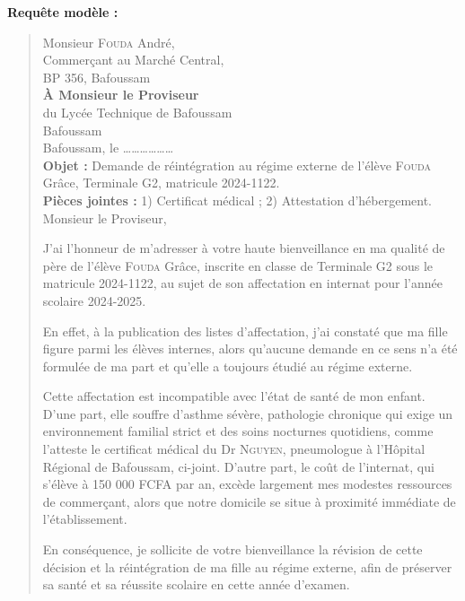 \documentclass[11pt]{article}
\begin{document}
\begin{corrige}
\textbf{Requête modèle :}
\begin{quote}
Monsieur \textsc{Fouda} André,\\
Commerçant au Marché Central,\\
BP 356, Bafoussam\\[0.5em]
\hspace*{6cm}\textbf{À Monsieur le Proviseur}\\
\hspace*{6cm}du Lycée Technique de Bafoussam\\
\hspace*{6cm}Bafoussam\\[0.5em]
\hspace*{6cm}Bafoussam, le \ldots\ldots\ldots\ldots\ldots\ldots\\[0.5em]
\textbf{Objet :} Demande de réintégration au régime externe de l'élève \textsc{Fouda} Grâce, Terminale G2, matricule 2024-1122.\\[0.3em]
\textbf{Pièces jointes :} 1) Certificat médical ; 2) Attestation d'hébergement.\\[0.8em]
Monsieur le Proviseur,

J'ai l'honneur de m'adresser à votre haute bienveillance en ma qualité de père de l'élève \textsc{Fouda} Grâce, inscrite en classe de Terminale G2 sous le matricule 2024-1122, au sujet de son affectation en internat pour l'année scolaire 2024-2025.

En effet, à la publication des listes d'affectation, j'ai constaté que ma fille figure parmi les élèves internes, alors qu'aucune demande en ce sens n'a été formulée de ma part et qu'elle a toujours étudié au régime externe.

Cette affectation est incompatible avec l'état de santé de mon enfant. D'une part, elle souffre d'asthme sévère, pathologie chronique qui exige un environnement familial strict et des soins nocturnes quotidiens, comme l'atteste le certificat médical du Dr \textsc{Nguyen}, pneumologue à l'Hôpital Régional de Bafoussam, ci-joint. D'autre part, le coût de l'internat, qui s'élève à 150 000 FCFA par an, excède largement mes modestes ressources de commerçant, alors que notre domicile se situe à proximité immédiate de l'établissement.

En conséquence, je sollicite de votre bienveillance la révision de cette décision et la réintégration de ma fille au régime externe, afin de préserver sa santé et sa réussite scolaire en cette année d'examen.


\end{quote}
\end{corrige}
\end{document}
